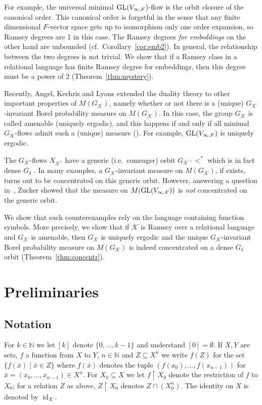 \documentclass[12pt]{amsart}
\theoremstyle{plain}
\theoremstyle{definition}
\begin{document}
For example, the universal minimal $\textup{GL}(V_{\infty,F})$-flow is the orbit closure of the canonical order. 
This canonical order is forgetful in the sense that any finite dimensional $F$-vector space gets up to isomorphism 
only one order expansion, so Ramsey degrees are 1 in this case. The Ramsey degrees {\em for embeddings} 
on the other hand are unbounded (cf.~Corollary~\ref{cor:emb2}). In general, the relationship between the two degrees is not trivial. 
We show that if a Ramsey class in a relational language has finite Ramsey degree for embeddings, then this degree must be 
a power of 2 (Theorem~\ref{thm:mystery}).
 

Recently, Angel, Kechris and Lyons \cite{akl} extended the duality theory to other important properties of $M(G_{\mathcal K})$, 
namely whether or not there is a (unique) $G_{\mathcal K}$-invariant Borel probability measure on $M(G_{\mathcal K})$. 
In this case, the group $G_{\mathcal K}$ is called amenable (uniquely ergodic), and this happens if and 
only if all minimal $G_{\mathcal K}$-flows admit such a (unique)
measure (\cite[P8.1]{akl}). 
For example, $\textup{GL}(V_{\infty,F})$ is uniquely ergodic.

The $G_{\mathcal K}$-flows $X_{{\mathcal K}^*}$ have a generic (i.e.\ comeager) orbit $G_{\mathcal K}\cdot <^*$ which is in 
fact dense $G_\delta$ \cite[P14.3]{akl}. In many examples, 
a
$G_{\mathcal K}$-invariant measure on $M(G_{\mathcal K})$, if exists, 
turns out to be concentrated on this generic orbit. However, answering a question in~\cite[Q15.3]{akl}, 
Zucker \cite[T1.2]{zucker} showed that the measure on $M(\textup{GL}(V_{\infty,F}))$ is {\em not} concentrated on the generic orbit.

We show that such counterexamples rely on the language containing function symbols. More precisely,
we show that if ${\mathcal K}$ is Ramsey over a relational language and $G_{\mathcal K}$ is amenable, then $G_{\mathcal K}$ is uniquely ergodic 
and the unique $G_{\mathcal K}$-invariant 
Borel probability measure on $M(G_{\mathcal K})$ is indeed concentrated on a dense $G_\delta$ orbit (Theorem~\ref{thm:concentr}).

\section{Preliminaries}

\subsection{Notation} For $k\in {\mathbb N}$ we let $[k]$ denote $\{0,\ldots,k-1\}$ and understand $[0]=\emptyset$. 
If $X,Y$ are sets, $f$ a function from $X$ to $Y$, $n\in {\mathbb N}$ and $Z\subseteq X^n$ we write $f(Z)$ for the 
set $\{f(\bar x)\mid \bar x\in Z\}$ where $f(\bar x)$ denotes the tuple $ (f(x_0),\ldots, f(x_{n-1}))$ 
for $\bar x=(x_0,\ldots, x_{n-1})\in X^n$.
For $X_0\subseteq X$ we let $f\upharpoonright X_0$ denote the restriction of $f$ to $X_0$; for a relation $Z$ 
as above, $Z\upharpoonright X_0$ denotes $Z\cap(X_0^n)$. The identity on $X$ is denoted by $\operatorname{id}_X$.
\end{document}
